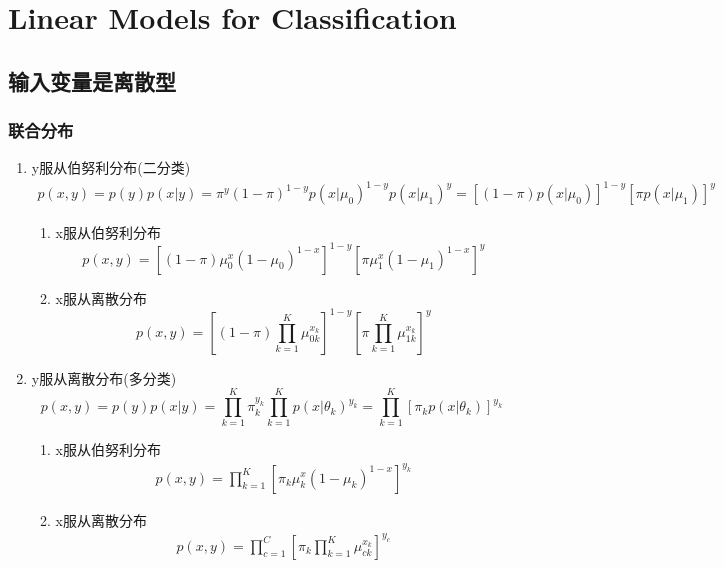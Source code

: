 \chapter{Linear Models for Classification}
\section{输入变量是离散型}
\subsection{联合分布}
\begin{enumerate}
\item y服从伯努利分布(二分类)
\begin{equation}
\begin{aligned}
p(x, y) = p(y)p(x|y) = \pi^y(1-\pi)^{1-y}
p(x|\mu_0)^{1-y}p(x|\mu_1)^y
= [(1-\pi)p(x|\mu_0)]^{1-y}[\pi p(x|\mu_1)]^y
\end{aligned}
\end{equation}
\begin{enumerate}
\item x服从伯努利分布
\begin{equation}
p(x, y) =[(1-\pi)\mu_0^x(1-\mu_0)^{1-x}]^{1-y}
[\pi\mu_1^x(1-\mu_1)^{1-x}]^y
\end{equation}
\item x服从离散分布
\begin{equation}
p(x, y) =[(1-\pi)\prod_{k=1}^K\mu_{0k}^{x_k}]^{1-y}
[\pi \prod_{k=1}^K\mu_{1k}^{x_k}]^y
\end{equation}
\end{enumerate}

\item y服从离散分布(多分类)
\begin{equation}
p(x, y) = p(y)p(x|y) = \prod_{k=1}^K\pi_k^{y_k}
\prod_{k=1}^Kp(x|\theta_k)^{y_k}
=\prod_{k=1}^K[\pi_kp(x|\theta_k)]^{y_k}
\end{equation}
\begin{enumerate}
\item x服从伯努利分布
\begin{equation}
\begin{aligned}
p(x, y) =\prod_{k=1}^K[\pi_k\mu_k^x(1-\mu_k)^{1-x}]^{y_k}
\end{aligned}
\end{equation}

\item x服从离散分布
\begin{equation}
\begin{aligned}
p(x, y) =\prod_{c=1}^C[\pi_k\prod_{k=1}^K\mu_{ck}^{x_k}]^{y_c}
\end{aligned}
\end{equation}

\end{enumerate}
\end{enumerate}

